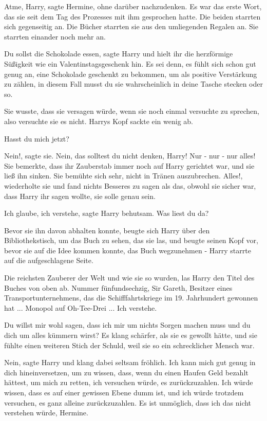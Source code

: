 \glqq{}Atme, Harry\grqq{}, sagte Hermine, ohne darüber nachzudenken. Es war das
erste Wort, das sie seit dem Tag des Prozesses mit ihm gesprochen hatte. Die
beiden starrten sich gegenseitig an. Die Bücher starrten sie aus den umliegenden
Regalen an. Sie starrten einander noch mehr an.

\glqq{}Du sollst die Schokolade essen\grqq{}, sagte Harry und hielt ihr die
herzförmige Süßigkeit wie ein Valentinstagsgeschenk hin. \glqq{}Es sei denn, es
fühlt sich schon gut genug an, eine Schokolade geschenkt zu bekommen, um als
positive Verstärkung zu zählen, in diesem Fall musst du sie wahrscheinlich in
deine Tasche stecken oder so.\grqq{}

Sie wusste, dass sie versagen würde, wenn sie noch einmal versuchte zu sprechen,
also versuchte sie es nicht. Harrys Kopf sackte ein wenig ab.

\glqq{}Hasst du mich jetzt?\grqq{}

\glqq{}Nein!\grqq{}, sagte sie. \glqq{}Nein, das solltest du nicht denken, Harry!
Nur - nur - nur alles!\grqq{} Sie bemerkte, dass ihr Zauberstab immer noch auf Harry
gerichtet war, und sie ließ ihn sinken. Sie bemühte sich sehr, nicht in Tränen
auszubrechen. \glqq{}Alles!\grqq{}, wiederholte sie und fand nichts Besseres zu
sagen als das, obwohl sie sicher war, dass Harry ihr sagen wollte, sie solle
genau sein.

\glqq{}Ich glaube, ich verstehe\grqq{}, sagte Harry behutsam. \glqq{}Was liest du
da?\grqq{}

Bevor sie ihn davon abhalten konnte, beugte sich Harry über den
Bibliothekstisch, um das Buch zu sehen, das sie las, und beugte seinen Kopf vor,
bevor sie auf die Idee kommen konnte, das Buch wegzunehmen - Harry starrte auf
die aufgeschlagene Seite.

\glqq{}Die reichsten Zauberer der Welt und wie sie so wurden\grqq{}, las Harry
den Titel des Buches von oben ab. \glqq{}Nummer fünfundsechzig, Sir Gareth,
Besitzer eines Transportunternehmens, das die Schifffahrtskriege im 19.
Jahrhundert gewonnen hat ... Monopol auf Oh-Tee-Drei ... Ich verstehe.\grqq{}

\glqq{}Du willst mir wohl sagen, dass ich mir um nichts Sorgen machen muss und du
dich um alles kümmern wirst?\grqq{} Es klang schärfer, als sie es gewollt hätte,
und sie fühlte einen weiteren Stich der Schuld, weil sie so ein schrecklicher
Mensch war.

\glqq{}Nein\grqq{}, sagte Harry und klang dabei seltsam fröhlich. \glqq{}Ich kann
mich gut genug in dich hineinversetzen, um zu wissen, dass, wenn du einen Haufen
Geld bezahlt hättest, um mich zu retten, ich versuchen würde, es zurückzuzahlen.
Ich würde wissen, dass es auf einer gewissen Ebene dumm ist, und ich würde
trotzdem versuchen, es ganz alleine zurückzuzahlen. Es ist unmöglich, dass ich
das nicht verstehen würde, Hermine.\grqq{}

